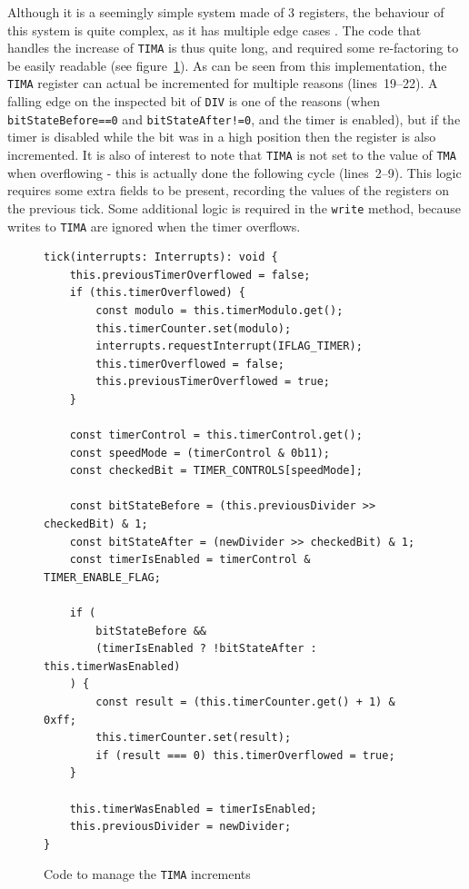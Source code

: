 \documentclass[11pt]{informatics-report}
\begin{document}
Although it is a seemingly simple system made of 3 registers, the behaviour of this system is quite complex, as it has multiple edge cases \cite[Timer obscure behaviour]{pandoc}. The code that handles the increase of \texttt{TIMA} is thus quite long, and required some re-factoring to be easily readable (see figure~\ref{fig:tima-increase}). As can be seen from this implementation, the \texttt{TIMA} register can actual be incremented for multiple reasons (lines~19--22). A falling edge on the inspected bit of \texttt{DIV} is one of the reasons (when \texttt{bitStateBefore==0} and \texttt{bitStateAfter!=0}, and the timer is enabled), but if the timer is disabled while the bit was in a high position then the register is also incremented. It is also of interest to note that \texttt{TIMA} is not set to the value of \texttt{TMA} when overflowing - this is actually done the following cycle (lines~2--9). This logic requires some extra fields to be present, recording the values of the registers on the previous tick. Some additional logic is required in the \texttt{write} method, because writes to \texttt{TIMA} are ignored when the timer overflows.

\begin{figure}[h]
    \begin{verbatim}
tick(interrupts: Interrupts): void {
    this.previousTimerOverflowed = false;
	if (this.timerOverflowed) {
        const modulo = this.timerModulo.get();
        this.timerCounter.set(modulo);
        interrupts.requestInterrupt(IFLAG_TIMER);
        this.timerOverflowed = false;
        this.previousTimerOverflowed = true;
    }
    
    const timerControl = this.timerControl.get();
    const speedMode = (timerControl & 0b11);
    const checkedBit = TIMER_CONTROLS[speedMode];

    const bitStateBefore = (this.previousDivider >> checkedBit) & 1;
    const bitStateAfter = (newDivider >> checkedBit) & 1;
    const timerIsEnabled = timerControl & TIMER_ENABLE_FLAG;

    if (
        bitStateBefore &&
        (timerIsEnabled ? !bitStateAfter : this.timerWasEnabled)
    ) {
        const result = (this.timerCounter.get() + 1) & 0xff;
        this.timerCounter.set(result);
        if (result === 0) this.timerOverflowed = true;
    }
    
    this.timerWasEnabled = timerIsEnabled;
    this.previousDivider = newDivider;
}
    \end{verbatim}
    \caption{Code to manage the \texttt{TIMA} increments}
    \label{fig:tima-increase}
\end{figure}
\end{document}
